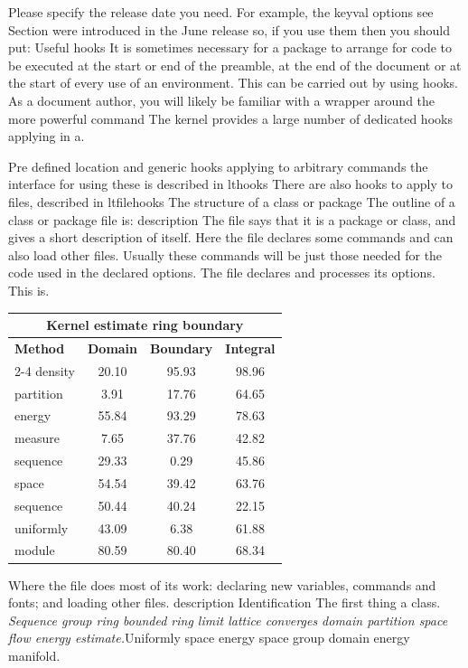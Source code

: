 \documentclass{article}
\begin{document}
Please specify the release date you need. For example, the keyval options see Section were introduced in the June release so, if you use them then you should put: Useful hooks It is sometimes necessary for a package to arrange for code to be executed at the start or end of the preamble, at the end of the document or at the start of every use of an environment. This can be carried out by using hooks. As a document author, you will likely be familiar with a wrapper around the more powerful command The kernel provides a large number of dedicated hooks applying in a.

Pre defined location and generic hooks applying to arbitrary commands the interface for using these is described in lthooks There are also hooks to apply to files, described in ltfilehooks The structure of a class or package The outline of a class or package file is: description The file says that it is a package or class, and gives a short description of itself. Here the file declares some commands and can also load other files. Usually these commands will be just those needed for the code used in the declared options. The file declares and processes its options. This is.
{\centering
\begin{tabular}{lccc}
\hline
\multicolumn{4}{c}{\bfseries Kernel estimate ring boundary} \\ \hline
\bfseries Method & \bfseries Domain & \bfseries Boundary & \bfseries Integral \\ \cline{2-4}
density & 20.10 & 95.93 & 98.96 \\
partition & 3.91 & 17.76 & 64.65 \\
energy & 55.84 & 93.29 & 78.63 \\
measure & 7.65 & 37.76 & 42.82 \\
sequence & 29.33 & 0.29 & 45.86 \\
space & 54.54 & 39.42 & 63.76 \\
sequence & 50.44 & 40.24 & 22.15 \\
uniformly & 43.09 & 6.38 & 61.88 \\
module & 80.59 & 80.40 & 68.34 \\
\hline
\end{tabular}
\par}
\noindent Where the file does most of its work: declaring new variables, commands and fonts; and loading other files. description Identification The first thing a class. {\itshape Sequence group ring bounded ring limit lattice converges domain partition space flow energy estimate.}\hspace{.05\textwidth}Uniformly space energy space group domain energy manifold.
\end{document}
